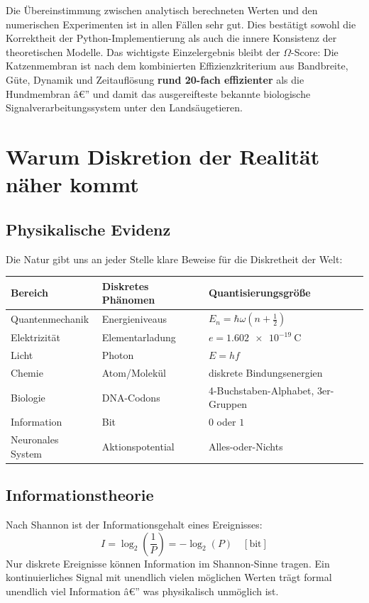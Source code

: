 ﻿\documentclass[12pt,a4paper,titlepage]{report}
\begin{document}
Die Übereinstimmung zwischen analytisch berechneten Werten und
den numerischen Experimenten ist in allen Fällen sehr gut.
Dies bestätigt sowohl die Korrektheit der Python-Implementierung
als auch die innere Konsistenz der theoretischen Modelle.
Das wichtigste Einzelergebnis bleibt der $\Omega$-Score:
Die Katzenmembran ist nach dem kombinierten Effizienzkriterium
aus Bandbreite, Güte, Dynamik und Zeitauflösung
\textbf{rund 20-fach effizienter} als die Hundmembran â€”
und damit das ausgereifteste bekannte biologische
Signalverarbeitungssystem unter den Landsäugetieren.

\chapter{Warum Diskretion der Realität näher kommt}

\section{Physikalische Evidenz}

Die Natur gibt uns an jeder Stelle klare Beweise für die Diskretheit der Welt:

\begin{center}
\begin{tabular}{lll}
\toprule
\textbf{Bereich} & \textbf{Diskretes Phänomen} & \textbf{Quantisierungsgröße} \\
\midrule
Quantenmechanik & Energieniveaus & $E_n = \hbar\omega(n + \tfrac{1}{2})$ \\
Elektrizität & Elementarladung & $e = \SI{1.602e-19}{\coulomb}$ \\
Licht & Photon & $E = hf$ \\
Chemie & Atom/Molekül & diskrete Bindungsenergien \\
Biologie & DNA-Codons & 4-Buchstaben-Alphabet, 3er-Gruppen \\
Information & Bit & $0$ oder $1$ \\
Neuronales System & Aktionspotential & Alles-oder-Nichts \\
\bottomrule
\end{tabular}
\end{center}

\section{Informationstheorie}

Nach Shannon ist der Informationsgehalt eines Ereignisses:
\[
	I = \log_2\!\left(\frac{1}{P}\right) = -\log_2(P) \quad [\text{bit}]
\]
Nur diskrete Ereignisse können Information im Shannon-Sinne tragen. 
Ein kontinuierliches Signal mit unendlich vielen möglichen Werten trägt 
formal unendlich viel Information â€” was physikalisch unmöglich ist.
\end{document}

